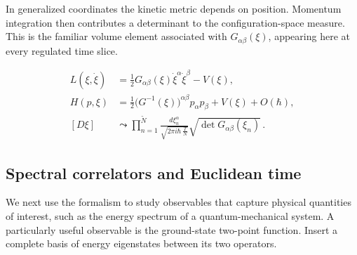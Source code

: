 In generalized coordinates the kinetic metric depends on position.  Momentum
integration then contributes a determinant to the configuration-space
measure.  This is the familiar volume element associated with
$G_{\alpha\beta}(\xi)$, appearing here at every regulated time slice.

\begin{align}
  L(\xi,\dot\xi)
  &=\frac12G_{\alpha\beta}(\xi)
    \dot\xi^\alpha\dot\xi^\beta-V(\xi),
  \label{eq:proposal-generalized-lagrangian}\\
  H(p,\xi)
  &=\frac12\bigl(G^{-1}(\xi)\bigr)^{\alpha\beta}
    p_\alpha p_\beta+V(\xi)+O(\hbar),
  \label{eq:proposal-generalized-hamiltonian}\\
  [D\xi]
  &\leadsto
  \prod_{n=1}^{\widetilde N}
  \frac{d\xi_n^\alpha}
  {\sqrt{2\pi i\hbar\,\frac{T}{N}}}
  \sqrt{\det G_{\alpha\beta}(\xi_n)}\,.
  \label{eq:proposal-generalized-measure}
\end{align}


\subsection{Spectral correlators and Euclidean time}

We next use the formalism to study observables that capture physical quantities
of interest, such as the energy spectrum of a quantum-mechanical system.  A
particularly useful observable is the ground-state two-point function.  Insert
a complete basis of energy eigenstates between its two operators.

